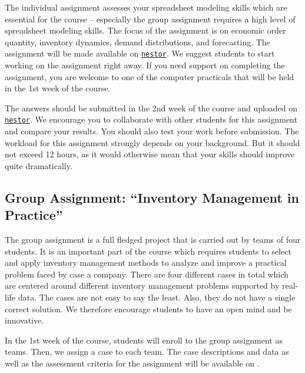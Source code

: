 \documentclass{article}
\begin{document}
The individual assignment assesses your spreadsheet modeling skills which are essential for the course -- especially the group assignment requires a high level of spreadsheet modeling skills. The focus of the assignment is on economic order quantity, inventory dynamics, demand distributions, and forecasting. The assignment will be made available on \href{nestor.rug.nl}{\texttt{nestor}}. We suggest students to start working on the assignment right away. If you need support on completing the assignment, you are welcome to one of the computer practicals that will be held in the 1st week of the course. 

The answers should be submitted in the 2nd week of the course and uploaded on \href{nestor.rug.nl}{\texttt{nestor}}. We encourage you to collaborate with other students for this assignment and compare your results. You should also test your work before submission. The workload for this assignment strongly depends on your background. But it should not exceed 12 hours, as it would otherwise mean that your skills should improve quite dramatically. 

\subsection{Group Assignment: ``Inventory Management in Practice''}
\label{sec:group}

The group assignment is a full fledged project that is carried out by teams of four students. It is an important part of the course which requires students to select and apply inventory management methods to analyze and improve a practical problem faced by case a company. There are four different cases in total which are centered around different inventory management problems supported by real-life data. The cases are not easy to say the least. Also, they do not have a single correct solution. We therefore encourage students to have an open mind and be innovative. 

In the 1st week of the course, students will enroll to the group assignment as teams. Then, we assign a case to each team. The case descriptions and data as well as the assessment criteria for the assignment will be available on \nestor.
\end{document}
